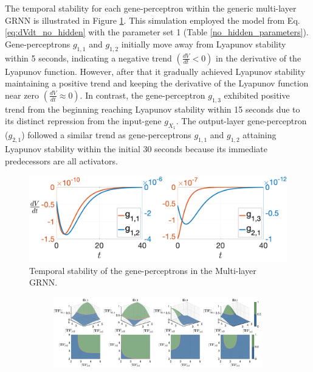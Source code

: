 \documentclass[twocolumn]{biophys-new}
\begin{document}
{{The temporal stability for each gene-perceptron within the generic multi-layer GRNN is illustrated in Figure \ref{fig:Lypunov_temporal_stability_net1}. This simulation employed the model from Eq. \ref{eq:dVdt_no_hidden}  with the parameter set 1 (Table \ref{no_hidden_parameters}). Gene-perceptrons  $g_{1,1}$ and $g_{1,2}$ initially move away from Lyapunov stability within 5 seconds, indicating a negative trend $ \left( \frac{dV}{dt} < 0 \right)$ in the derivative of the Lyapunov function. 
However, after that it gradually achieved Lyapunov stability maintaining a positive trend and keeping the derivative of the Lyapunov function near zero   $ \left( \frac{dV}{dt} \approx 0 \right)$. In contrast, the gene-perceptron $g_{1,3}$ exhibited positive trend from the beginning reaching Lyapunov stability within 15 seconds due to its distinct repression from the input-gene $g_{X_1}$. The output-layer gene-perceptron ($g_{2,1}$) followed a similar trend as gene-perceptrons $g_{1,1}$ and $g_{1,2}$ attaining Lyapunov stability within the initial 30 seconds because its immediate predecessors are all activators. 

\begin{figure}[ht!] %
\centering
\includegraphics[width=\linewidth]{figures/temporal_stab_net1.pdf}
\vspace{-2em}
\caption{Temporal stability of the gene-perceptrons in the  Multi-layer GRNN.  \vspace{-0.5em}}
\label{fig:Lypunov_temporal_stability_net1}
\end{figure}

\begin{figure}[ht!]
\centering

\begin{subfigure}{0.8\textwidth}
    \includegraphics[width=\textwidth ]{figures/para_set-1.pdf}
    \caption{}
    \label{fig:full_net_para_config_1}
\end{subfigure}


\end{figure}}}
\end{document}
